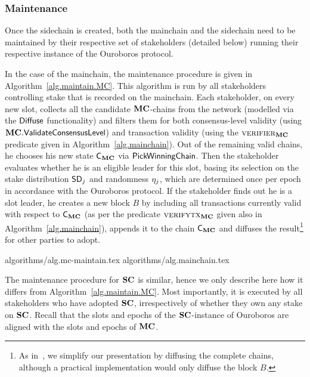 
\subsubsection{Maintenance}

Once the sidechain is created, both the mainchain and the sidechain need to be
maintained by their respective set of stakeholders (detailed below) running
their respective instance of the Ouroboros protocol.

In the case of the mainchain, the maintenance procedure is given
in Algorithm~\ref{alg.maintain.MC}.
This algorithm is run by all stakeholders controlling stake that is recorded on
the mainchain. Each stakeholder, on every new slot, collects all the candidate
$\mathbf{MC}$-chains from the network (modelled via the $\mathsf{Diffuse}$ functionality) and
filters them for both consensus-level validity (using $\mathbf{MC}.\mathsf{ValidateConsensusLevel}$) and
transaction validity (using the $\textsc{verifier}_{\mathbf{MC}}$ predicate given in
Algorithm~\ref{alg.mainchain}). Out of the remaining valid chains, he chooses
his new state $\mathsf{C}_{\mathbf{MC}}$ via $\mathsf{PickWinningChain}$. Then the stakeholder
evaluates whether he is an eligible leader for this slot, basing its selection
on the stake distribution $\mathsf{SD}_j$ and randomness $\eta_j$, which are determined
once per epoch
in accordance with the Ouroboros protocol.
If the stakeholder finds out he is a slot leader, he creates a new block $B$ by
including all transactions currently valid with respect to $\mathsf{C}_{\mathbf{MC}}$
(as per the predicate $\textsc{verifytx}_{\mathbf{MC}}$ given also in Algorithm~\ref{alg.mainchain}),
appends it to the chain $\mathsf{C}_{\mathbf{MC}}$ and diffuses the result\footnote{
As in~\cite{C:KRDO17,EC:DGKR18}, we simplify our
presentation by diffusing the complete chains,
although a practical implementation would only diffuse the block $B$.}
for other parties to adopt.

{algorithms/alg.mc-maintain.tex}
{algorithms/alg.mainchain.tex}

The maintenance procedure for $\mathbf{SC}$ is similar, hence we only
describe here how it differs from Algorithm~\ref{alg.maintain.MC}. Most
importantly, it is executed by all stakeholders who have adopted $\mathbf{SC}$,
irrespectively of whether they own any stake on $\mathbf{SC}$.
Recall that the slots and epochs of the $\mathbf{SC}$-instance of Ouroboros are aligned
with the slots and epochs of $\mathbf{MC}$.

